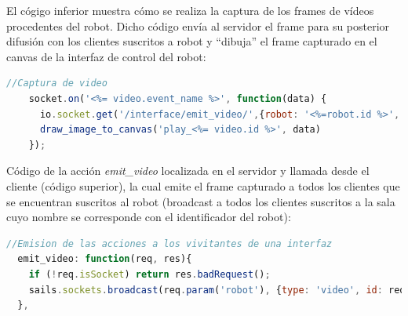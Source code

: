  
El cógigo inferior muestra cómo se realiza la captura de los frames de vídeos procedentes del robot. Dicho código envía al servidor el frame para su posterior difusión con los clientes suscritos
a robot y ``dibuja'' el frame capturado en el canvas de la interfaz de control del robot:\\
 
 
\begin{lstlisting}[language=JavaScript] 
    //Captura de video
    socket.on('<%= video.event_name %>', function(data) {
      io.socket.get('/interface/emit_video/',{robot: '<%=robot.id %>', id: '<%= video.id %>', msg: data });
      draw_image_to_canvas('play_<%= video.id %>', data)
    });
\end{lstlisting}


Código de la acción \emph{emit\_video} localizada en el servidor y llamada desde el cliente (código superior), la cual emite el frame capturado a todos los clientes que se encuentran suscritos al robot 
(broadcast a todos los clientes suscritos a la sala cuyo nombre se corresponde con el identificador del robot):\\

\begin{lstlisting}[language=JavaScript] 
  //Emision de las acciones a los vivitantes de una interfaz
  emit_video: function(req, res){
    if (!req.isSocket) return res.badRequest();
    sails.sockets.broadcast(req.param('robot'), {type: 'video', id: req.param('id'), msg: req.param('msg')});
  },
\end{lstlisting}



